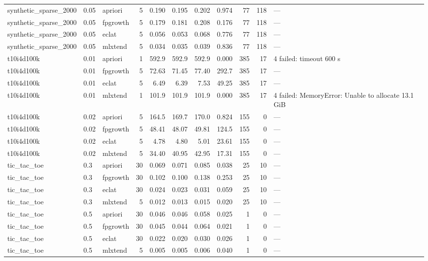 \documentclass[journal,a4paper]{IEEEtran}
\begin{document}
\begin{longtable}{p{3.0cm}llrrrrrrrp{2.4cm}}
synthetic\_\allowbreak{}sparse\_\allowbreak{}2000 & 0.05 & apriori & 5 & 0.190 & 0.195 & 0.202 & 0.974 & 77 & 118 & --- \\
synthetic\_\allowbreak{}sparse\_\allowbreak{}2000 & 0.05 & fpgrowth & 5 & 0.179 & 0.181 & 0.208 & 0.176 & 77 & 118 & --- \\
synthetic\_\allowbreak{}sparse\_\allowbreak{}2000 & 0.05 & eclat & 5 & 0.056 & 0.053 & 0.068 & 0.776 & 77 & 118 & --- \\
synthetic\_\allowbreak{}sparse\_\allowbreak{}2000 & 0.05 & mlxtend & 5 & 0.034 & 0.035 & 0.039 & 0.836 & 77 & 118 & --- \\
t10i4d100k & 0.01 & apriori & 1 & 592.9 & 592.9 & 592.9 & 0.000 & 385 & 17 & 4 failed: timeout 600 s \\
t10i4d100k & 0.01 & fpgrowth & 5 & 72.63 & 71.45 & 77.40 & 292.7 & 385 & 17 & --- \\
t10i4d100k & 0.01 & eclat & 5 & 6.49 & 6.39 & 7.53 & 49.25 & 385 & 17 & --- \\
t10i4d100k & 0.01 & mlxtend & 1 & 101.9 & 101.9 & 101.9 & 0.000 & 385 & 17 & 4 failed: MemoryError: Unable to allocate 13.1 GiB \\
t10i4d100k & 0.02 & apriori & 5 & 164.5 & 169.7 & 170.0 & 0.824 & 155 & 0 & --- \\
t10i4d100k & 0.02 & fpgrowth & 5 & 48.41 & 48.07 & 49.81 & 124.5 & 155 & 0 & --- \\
t10i4d100k & 0.02 & eclat & 5 & 4.78 & 4.80 & 5.01 & 23.61 & 155 & 0 & --- \\
t10i4d100k & 0.02 & mlxtend & 5 & 34.40 & 40.95 & 42.95 & 17.31 & 155 & 0 & --- \\
tic\_\allowbreak{}tac\_\allowbreak{}toe & 0.3 & apriori & 30 & 0.069 & 0.071 & 0.085 & 0.038 & 25 & 10 & --- \\
tic\_\allowbreak{}tac\_\allowbreak{}toe & 0.3 & fpgrowth & 30 & 0.102 & 0.100 & 0.138 & 0.253 & 25 & 10 & --- \\
tic\_\allowbreak{}tac\_\allowbreak{}toe & 0.3 & eclat & 30 & 0.024 & 0.023 & 0.031 & 0.059 & 25 & 10 & --- \\
tic\_\allowbreak{}tac\_\allowbreak{}toe & 0.3 & mlxtend & 5 & 0.012 & 0.013 & 0.015 & 0.020 & 25 & 10 & --- \\
tic\_\allowbreak{}tac\_\allowbreak{}toe & 0.5 & apriori & 30 & 0.046 & 0.046 & 0.058 & 0.025 & 1 & 0 & --- \\
tic\_\allowbreak{}tac\_\allowbreak{}toe & 0.5 & fpgrowth & 30 & 0.045 & 0.044 & 0.064 & 0.021 & 1 & 0 & --- \\
tic\_\allowbreak{}tac\_\allowbreak{}toe & 0.5 & eclat & 30 & 0.022 & 0.020 & 0.030 & 0.026 & 1 & 0 & --- \\
tic\_\allowbreak{}tac\_\allowbreak{}toe & 0.5 & mlxtend & 5 & 0.005 & 0.005 & 0.006 & 0.040 & 1 & 0 & --- \\
\bottomrule
\end{longtable}
\end{document}

